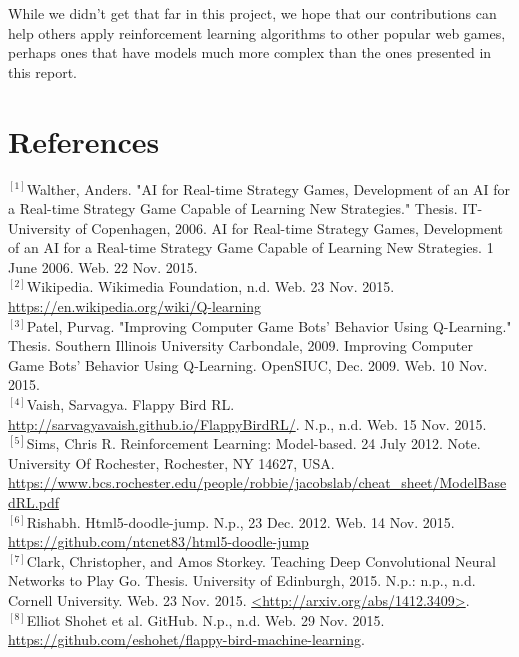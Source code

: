\documentclass[a4paper, 12pt]{article}
\begin{document}
While we didn't get that far in this project, we hope that our contributions can help others apply reinforcement learning algorithms to other popular web games, perhaps ones that have models much more complex than the ones presented in this report.

\section{References}

$^{[1]}$Walther, Anders. "AI for Real-time Strategy Games, Development of an AI for a Real-time Strategy Game Capable of Learning New Strategies." Thesis. IT-University of Copenhagen, 2006. AI for Real-time Strategy Games, Development of an AI for a Real-time Strategy Game Capable of Learning New Strategies. 1 June 2006. Web. 22 Nov. 2015. \\

$^{[2]}$Wikipedia. Wikimedia Foundation, n.d. Web. 23 Nov. 2015. \url{https://en.wikipedia.org/wiki/Q-learning}\\

$^{[3]}$Patel, Purvag. "Improving Computer Game Bots' Behavior Using Q-Learning." Thesis. Southern Illinois University Carbondale, 2009. Improving Computer Game Bots' Behavior Using Q-Learning. OpenSIUC, Dec. 2009. Web. 10 Nov. 2015.\\

$^{[4]}$Vaish, Sarvagya. Flappy Bird RL. \url{http://sarvagyavaish.github.io/FlappyBirdRL/}. N.p., n.d. Web. 15 Nov. 2015.\\

$^{[5]}$Sims, Chris R. Reinforcement Learning: Model-based. 24 July 2012. Note. University Of Rochester, Rochester, NY 14627, USA.
\url{https://www.bcs.rochester.edu/people/robbie/jacobslab/cheat_sheet/ModelBasedRL.pdf}\\

$^{[6]}$Rishabh. Html5-doodle-jump. N.p., 23 Dec. 2012. Web. 14 Nov. 2015.
\url{https://github.com/ntcnet83/html5-doodle-jump}\\

$^{[7]}$Clark, Christopher, and Amos Storkey. Teaching Deep Convolutional Neural Networks to Play Go. Thesis. University of Edinburgh, 2015. N.p.: n.p., n.d. Cornell University. Web. 23 Nov. 2015. \url{<http://arxiv.org/abs/1412.3409>}. \\

$^{[8]}$Elliot Shohet et al. GitHub. N.p., n.d. Web. 29 Nov. 2015. \url{https://github.com/eshohet/flappy-bird-machine-learning}.\\
\end{document}
